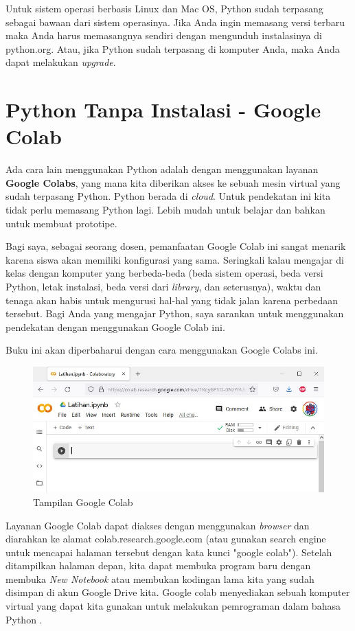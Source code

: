 Untuk sistem operasi berbasis Linux dan Mac OS, Python sudah terpasang sebagai
bawaan dari sistem operasinya. Jika Anda ingin memasang versi terbaru maka
Anda harus memasangnya sendiri dengan mengunduh instalasinya di python.org.
Atau, jika Python sudah terpasang di komputer Anda, maka Anda dapat melakukan
{\em upgrade}.

\section{Python Tanpa Instalasi - Google Colab}

Ada cara lain menggunakan Python adalah dengan menggunakan layanan
{\bf Google Colabs}, yang mana kita diberikan akses ke sebuah mesin virtual
yang sudah terpasang Python. Python berada di {\em cloud}.
Untuk pendekatan ini kita tidak perlu memasang Python lagi. 
Lebih mudah untuk belajar dan bahkan untuk membuat prototipe.

Bagi saya, sebagai seorang dosen, pemanfaatan Google Colab ini
sangat menarik karena siswa akan memiliki konfigurasi yang sama.
Seringkali kalau mengajar di kelas dengan komputer yang berbeda-beda 
(beda sistem operasi, beda versi Python, letak instalasi, beda versi
dari {\em library}, dan seterusnya), waktu dan tenaga akan habis untuk 
mengurusi hal-hal yang tidak jalan karena perbedaan tersebut.
Bagi Anda yang mengajar Python, saya sarankan untuk menggunakan
pendekatan dengan menggunakan Google Colab ini.

Buku ini akan diperbaharui dengan cara menggunakan Google Colabs ini.

\begin{figure}
\includegraphics[width=1.0\linewidth]{graphics/google-colab.jpg}
\caption{Tampilan Google Colab}
\end{figure}

Layanan Google Colab dapat diakses dengan menggunakan {\em browser} dan
diarahkan ke alamat colab.research.google.com (atau gunakan search engine
untuk mencapai halaman tersebut dengan kata kunci "google colab").
Setelah ditampilkan halaman depan, kita dapat membuka program baru dengan
membuka {\em New Notebook} atau membukan kodingan lama kita yang sudah
disimpan di akun Google Drive kita.
Google colab menyediakan sebuah komputer virtual yang dapat kita gunakan
untuk melakukan pemrograman dalam bahasa Python .


